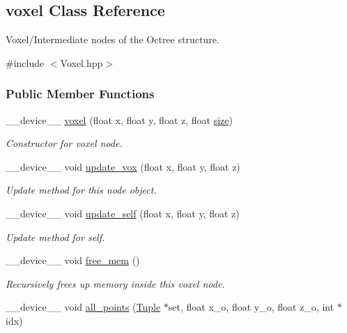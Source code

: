 \hypertarget{classvoxel}{}\subsection{voxel Class Reference}
\label{classvoxel}


Voxel/\+Intermediate nodes of the Octree structure.  




{\ttfamily \#include $<$Voxel.\+hpp$>$}

\subsubsection*{Public Member Functions}
\begin{DoxyCompactItemize}
\item 
\+\_\+\+\_\+device\+\_\+\+\_\+ \hyperlink{classvoxel_a1f832fd40f23c4fd721a4144387db6ef}{voxel} (float x, float y, float z, float \hyperlink{classvoxel_a573bae3d6e8383a4b2235d3cd33e7ab6}{size})
\begin{DoxyCompactList}\small\item\em Constructor for voxel node. \end{DoxyCompactList}\item 
\+\_\+\+\_\+device\+\_\+\+\_\+ void \hyperlink{classvoxel_a97737aec7c381e72d929d2f084952683}{update\+\_\+vox} (float x, float y, float z)
\begin{DoxyCompactList}\small\item\em Update method for this node object. \end{DoxyCompactList}\item 
\+\_\+\+\_\+device\+\_\+\+\_\+ void \hyperlink{classvoxel_a1748472909af5ef1f28d0a0c6648dbbd}{update\+\_\+self} (float x, float y, float z)
\begin{DoxyCompactList}\small\item\em Update method for self. \end{DoxyCompactList}\item 
\+\_\+\+\_\+device\+\_\+\+\_\+ void \hyperlink{classvoxel_aff25abf72186eb31821d1ffacf557c67}{free\+\_\+mem} ()
\begin{DoxyCompactList}\small\item\em Recursively frees up memory inside this voxel node. \end{DoxyCompactList}\item 
\+\_\+\+\_\+device\+\_\+\+\_\+ void \hyperlink{classvoxel_a4189fb0f24ad9eba1447e2ebf8ee0015}{all\+\_\+points} (\hyperlink{structTuple}{Tuple} $\ast$set, float x\+\_\+o, float y\+\_\+o, float z\+\_\+o, int $\ast$idx)

\end{DoxyCompactItemize}
